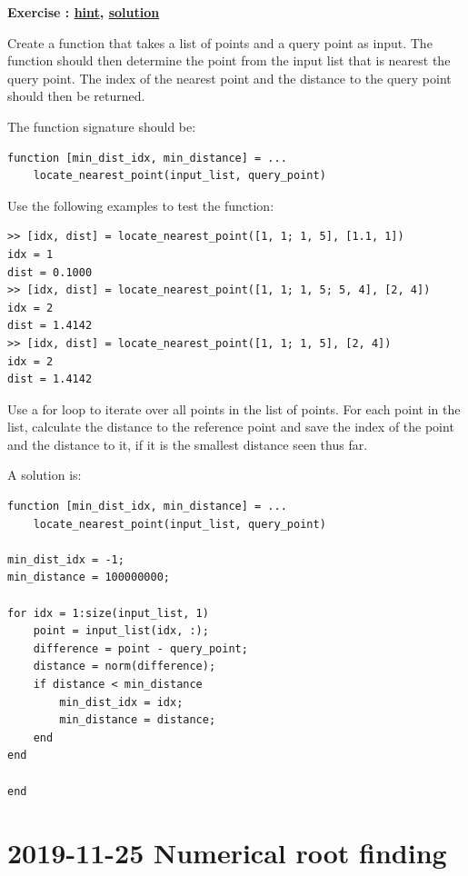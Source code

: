 \documentclass[12pt,a4paper]{article}
\makeatletter
\newcommand{\linkdest}[1]{\Hy@raisedlink{\hypertarget{#1}{}}}
\newcounter{ex}
\numberwithin{ex}{section}
\newenvironment{ex}[1][]{%
\filbreak
\bigskip
\refstepcounter{ex}
\noindent
\textbf{\linkdest{\theex{}exercise}{}Exercise \theex{}: #1\hfill\hyperlink{\theex{}hint}{hint}, \hyperlink{\theex{}solution}{solution}}\par\noindent}{}
\makeatother
\begin{document}
\begin{ex}
Create a function that takes a list of points and a query point
as input.
The function should then determine the point from the 
input list that is nearest the query point.
The index of the nearest point and the distance to the 
query point should then be returned.

The function signature should be:
\begin{lstlisting}
function [min_dist_idx, min_distance] = ...
    locate_nearest_point(input_list, query_point)
\end{lstlisting}
Use the following examples to test the function:
\begin{lstlisting}
>> [idx, dist] = locate_nearest_point([1, 1; 1, 5], [1.1, 1])
idx = 1
dist = 0.1000
>> [idx, dist] = locate_nearest_point([1, 1; 1, 5; 5, 4], [2, 4])
idx = 2
dist = 1.4142
>> [idx, dist] = locate_nearest_point([1, 1; 1, 5], [2, 4])
idx = 2
dist = 1.4142
\end{lstlisting}
\begin{hint}
Use a for loop to iterate over all points in the list of points.
For each point in the list, calculate the distance to the 
reference point and save the index of the point and the
distance to it, if it is the smallest distance seen thus far.
\end{hint}
\begin{sol}
A solution is:
\begin{lstlisting}
function [min_dist_idx, min_distance] = ...
    locate_nearest_point(input_list, query_point)

min_dist_idx = -1;
min_distance = 100000000;

for idx = 1:size(input_list, 1)
    point = input_list(idx, :);
    difference = point - query_point;
    distance = norm(difference);
    if distance < min_distance
        min_dist_idx = idx;
        min_distance = distance;
    end
end

end
\end{lstlisting}
\end{sol}
\end{ex}


\newpage
\section{2019-11-25 Numerical root finding}

\end{document}
